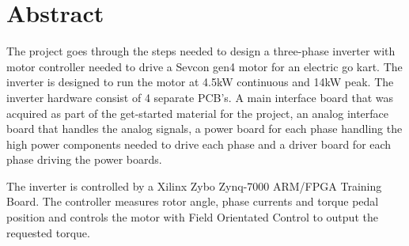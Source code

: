 \section{Abstract}

The project goes through the steps needed to design a three-phase inverter with motor controller needed to drive a Sevcon gen4 motor for an electric go kart. 
The inverter is designed to run the motor at 4.5kW continuous and 14kW peak. The inverter hardware consist of 4 separate PCB's. A main interface board that was acquired as part of the get-started material for the project, an analog interface board that handles the analog signals, a power board for each phase handling the high power components needed to drive each phase and a driver board for each phase driving the power boards. 

The inverter is controlled by a Xilinx Zybo Zynq-7000 ARM/FPGA Training Board. The controller measures rotor angle, phase currents and torque pedal position and controls the motor with Field Orientated Control to output the requested torque. 








